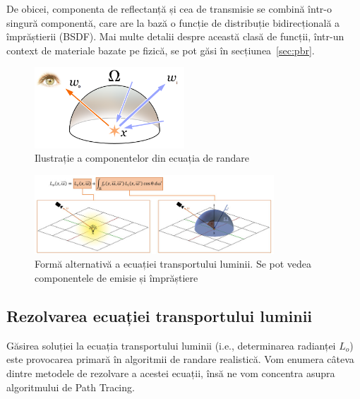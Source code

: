 \documentclass[12pt,a4paper]{report}
\numberwithin{equation}{section} %
\begin{document}
De obicei, componenta de reflectanță și cea de transmisie se combină într-o singură
componentă, care are la bază o funcție de distribuție bidirecțională a împrăștierii (BSDF).
Mai multe detalii despre această clasă de funcții, într-un context de materiale
bazate pe fizică, se pot găsi în secțiunea~\ref{sec:pbr}.

\begin{figure}[ht]
	\centering
	\includegraphics[width=0.5\textwidth]{pics/rendering_eq2.png}
	\caption{Ilustrație a componentelor din ecuația de randare\protect\footnotemark}
	\label{fig:light_transport2}
\end{figure}

\begin{figure}[ht]
	\centering
	\includegraphics[width=0.8\textwidth]{pics/rendering_eq.png}
	\caption{Formă alternativă a ecuației transportului luminii. Se pot vedea componentele de emisie și împrăștiere\protect\footnotemark}
	\label{fig:light_transport}
\end{figure}

\subsection{Rezolvarea ecuației transportului luminii}

Găsirea soluției la ecuația transportului luminii (i.e., determinarea radianței $L_o$)
este provocarea primară în algoritmii de randare realistică. Vom enumera câteva dintre
metodele de rezolvare a acestei ecuații, însă ne vom concentra asupra algoritmului
de Path Tracing.
\end{document}
